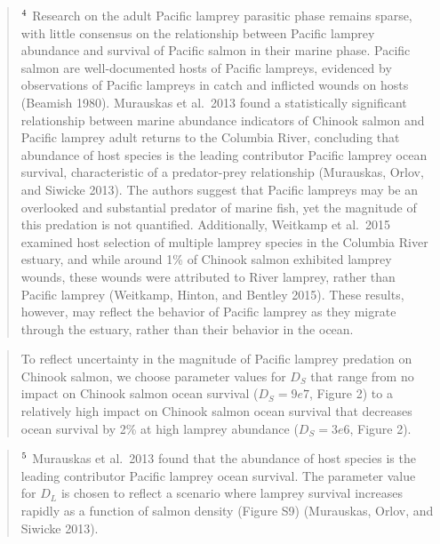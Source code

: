\documentclass[
]{article}
\begin{document}
\begin{quote}
\(\textsuperscript{4}\) Research on the adult Pacific lamprey parasitic
phase remains sparse, with little consensus on the relationship between
Pacific lamprey abundance and survival of Pacific salmon in their marine
phase. Pacific salmon are well-documented hosts of Pacific lampreys,
evidenced by observations of Pacific lampreys in catch and inflicted
wounds on hosts (Beamish 1980). Murauskas et al.~2013 found a
statistically significant relationship between marine abundance
indicators of Chinook salmon and Pacific lamprey adult returns to the
Columbia River, concluding that abundance of host species is the leading
contributor Pacific lamprey ocean survival, characteristic of a
predator-prey relationship (Murauskas, Orlov, and Siwicke 2013). The
authors suggest that Pacific lampreys may be an overlooked and
substantial predator of marine fish, yet the magnitude of this predation
is not quantified. Additionally, Weitkamp et al.~2015 examined host
selection of multiple lamprey species in the Columbia River estuary, and
while around 1\% of Chinook salmon exhibited lamprey wounds, these
wounds were attributed to River lamprey, rather than Pacific lamprey
(Weitkamp, Hinton, and Bentley 2015). These results, however, may
reflect the behavior of Pacific lamprey as they migrate through the
estuary, rather than their behavior in the ocean.
\end{quote}

\begin{quote}
To reflect uncertainty in the magnitude of Pacific lamprey predation on
Chinook salmon, we choose parameter values for \(D_S\) that range from
no impact on Chinook salmon ocean survival (\(D_S = 9e7\), Figure 2) to
a relatively high impact on Chinook salmon ocean survival that decreases
ocean survival by 2\% at high lamprey abundance (\(D_S = 3e6\), Figure
2).
\end{quote}

\begin{quote}
\(\textsuperscript{5}\) Murauskas et al.~2013 found that the abundance
of host species is the leading contributor Pacific lamprey ocean
survival. The parameter value for \(D_L\) is chosen to reflect a
scenario where lamprey survival increases rapidly as a function of
salmon density (Figure S9) (Murauskas, Orlov, and Siwicke 2013).
\end{quote}
\end{document}
